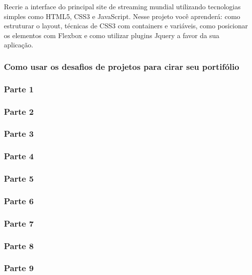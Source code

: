 \documentclass[12pt,a4paper]{article}
\begin{document}
	Recrie a interface do principal site de streaming mundial utilizando tecnologias simples como HTML5, CSS3 e JavaScript. Nesse projeto você aprenderá: como estruturar o layout, técnicas de CSS3 com containers e variáveis, como posicionar os elementos com Flexbox e como utilizar plugins Jquery a favor da sua aplicação.
	
	\subsubsection{Como usar os desafios de projetos para cirar seu portifólio}
	
	\subsubsection{Parte 1}
	
	\subsubsection{Parte 2}
	
	\subsubsection{Parte 3}
	
	\subsubsection{Parte 4}
	
	\subsubsection{Parte 5}
	
	\subsubsection{Parte 6}
	
	\subsubsection{Parte 7}
	
	\subsubsection{Parte 8}
	
	\subsubsection{Parte 9}
	
\end{document}

